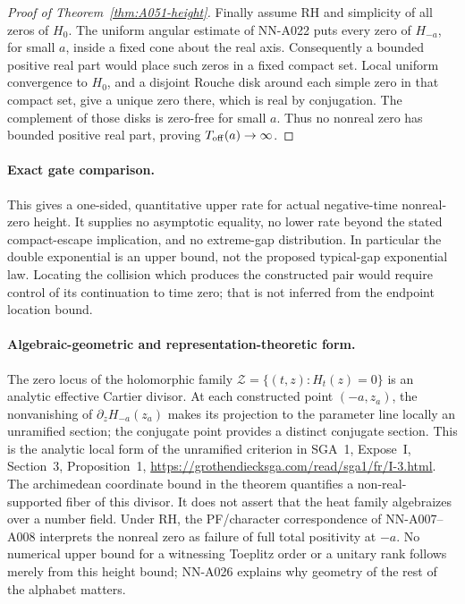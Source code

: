 \begin{proof}[Proof of Theorem~\ref{thm:A051-height}]
Finally assume RH and simplicity of all zeros of \(H_0\).
The uniform angular estimate of NN-A022 puts every zero of
\(H_{-a}\), for small \(a\), inside a fixed cone about the real axis.
Consequently a bounded positive real part would place such zeros
in a fixed compact set. Local uniform convergence to \(H_0\),
and a disjoint Rouche disk around each simple zero in that compact
set, give a unique zero there, which is real by conjugation.
The complement of those disks is zero-free for small \(a\).
Thus no nonreal zero has bounded positive real part, proving
\(T_{\rm off}(a)\to\infty\).
\end{proof}

\paragraph{Exact gate comparison.}
This gives a one-sided, quantitative upper rate for actual
negative-time nonreal-zero height. It supplies no asymptotic equality,
no lower rate beyond the stated compact-escape implication, and no
extreme-gap distribution. In particular the double exponential is
an upper bound, not the proposed typical-gap exponential law.
Locating the collision which produces the constructed pair would
require control of its continuation to time zero; that is not
inferred from the endpoint location bound.

\paragraph{Algebraic-geometric and representation-theoretic form.}
The zero locus of the holomorphic family
\(\mathcal Z=\{(t,z):H_t(z)=0\}\) is an analytic effective Cartier
divisor. At each constructed point \((-a,z_a)\), the nonvanishing
of \(\partial_zH_{-a}(z_a)\) makes its projection to the parameter
line locally an unramified section; the conjugate point provides
a distinct conjugate section. This is the analytic local form of
the unramified criterion in SGA~1, Expose~I, Section~3,
Proposition~1,
\url{https://grothendiecksga.com/read/sga1/fr/I-3.html}.
The archimedean coordinate bound in the theorem quantifies a
non-real-supported fiber of this divisor. It does not assert that
the heat family algebraizes over a number field. Under RH, the
PF/character correspondence of NN-A007--A008 interprets the
nonreal zero as failure of full total positivity at \(-a\).
No numerical upper bound for a witnessing Toeplitz order or a
unitary rank follows merely from this height bound; NN-A026
explains why geometry of the rest of the alphabet matters.


